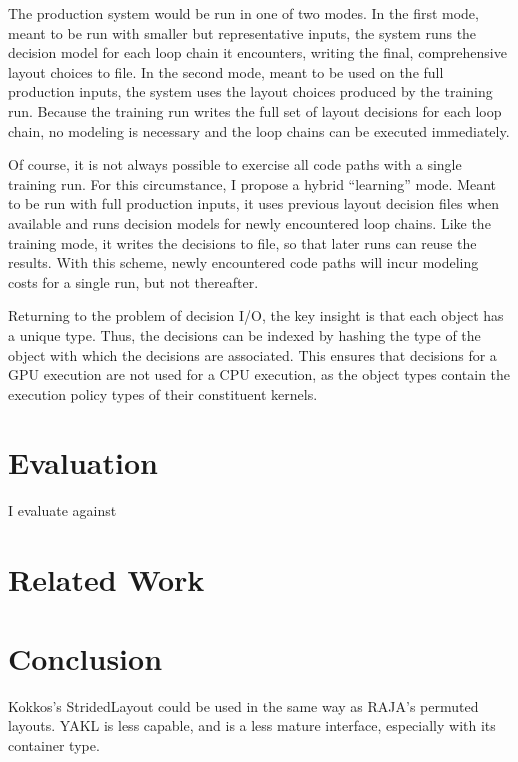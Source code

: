 The production system would be run in one of two modes.
In the first mode, meant to be run with smaller but representative inputs, the system runs the decision model for each loop chain it encounters, writing the final, comprehensive layout choices to file.
In the second mode, meant to be used on the full production inputs, the system uses the layout choices produced by the training run.
Because the training run writes the full set of layout decisions for each loop chain, no modeling is necessary and the loop chains can be executed immediately.

Of course, it is not always possible to exercise all code paths with a single training run. 
For this circumstance, I propose a hybrid ``learning'' mode.
Meant to be run with full production inputs, it uses previous layout decision files when available and runs decision models for newly encountered loop chains.
Like the training mode, it writes the decisions to file, so that later runs can reuse the results.
With this scheme, newly encountered code paths will incur modeling costs for a single run, but not thereafter.

Returning to the problem of decision I/O, the key insight is that each \FormatDecisions{} object has a unique type.
Thus, the decisions can be indexed by hashing the type of the \FormatDecisions{} object with which the decisions are associated.
This ensures that decisions for a GPU execution are not used for a CPU execution, as the \FormatDecisions{} object types contain the execution policy types of their constituent kernels.


\section{Evaluation}

I evaluate \FormatDecisions{} against 
\section{Related Work}

\section{Conclusion}

Kokkos's StridedLayout could be used in the same way as RAJA's permuted layouts. 
YAKL is less capable, and is a less mature interface, especially with its container type.







